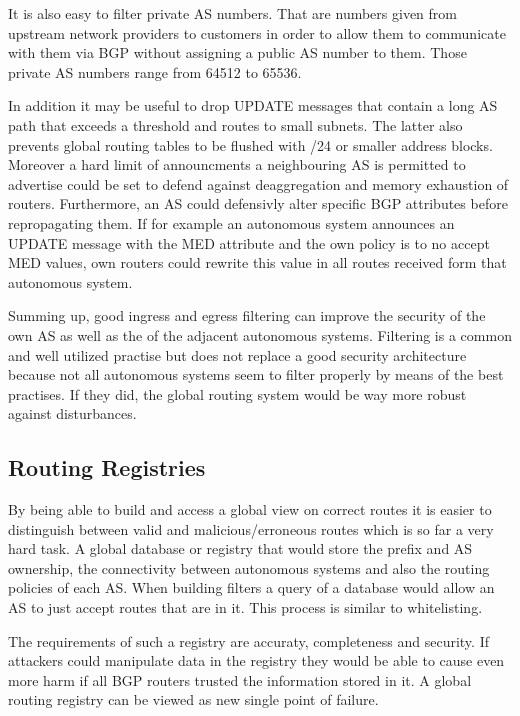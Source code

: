 \documentclass[12pt,a4paper]{IEEEtran}
\begin{document}
		It is also easy to filter private AS numbers. That are numbers given from upstream network providers to customers in order to allow them to communicate with them via BGP without assigning a public AS number to them. Those private AS numbers range from 64512 to 65536.

		In addition it may be useful to drop UPDATE messages that contain a long AS path that exceeds a threshold and routes to small subnets. The latter also prevents global routing tables to be flushed with /24 or smaller address blocks. 
		Moreover a hard limit of announcments a neighbouring AS is permitted to advertise could be set to defend against deaggregation and memory exhaustion of routers.
		Furthermore, an AS could defensivly alter specific BGP attributes before repropagating them. If for example an autonomous system  announces an UPDATE message with the MED attribute and the own policy is to no accept MED values, own routers could rewrite this value in all routes received form that autonomous system.
		
		Summing up, good ingress and egress filtering can improve the security of the own AS as well as the of the  adjacent autonomous systems.
		Filtering is a common and well utilized practise but does not replace a good security architecture because not all autonomous systems seem to filter properly by means of the best practises. If they did, the global routing system would be way more robust against disturbances. 

       \subsection{Routing Registries}
		By being able to build and access a global view on correct routes it is easier to distinguish between valid and malicious/erroneous routes which is so far a very hard task. 
		A global database or registry that would store the prefix and AS ownership, the connectivity between autonomous systems and also the routing policies of each AS. 	
		When building filters a query of a database would allow an AS to just accept routes that are in it. This process is similar to whitelisting.
		
		The requirements of such a registry are accuraty, completeness and security. If attackers could manipulate data in the registry they would be able to cause even more harm if all BGP routers trusted the information stored in it. A global routing registry can be viewed as new single point of failure. 
			
\end{document}
